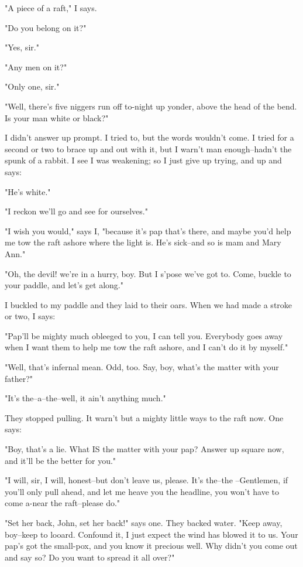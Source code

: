 "A piece of a raft," I says.

"Do you belong on it?"

"Yes, sir."

"Any men on it?"

"Only one, sir."

"Well, there's five niggers run off to-night up yonder, above the head of
the bend.  Is your man white or black?"

I didn't answer up prompt.  I tried to, but the words wouldn't come. I
tried for a second or two to brace up and out with it, but I warn't man
enough--hadn't the spunk of a rabbit.  I see I was weakening; so I just
give up trying, and up and says:

"He's white."

"I reckon we'll go and see for ourselves."

"I wish you would," says I, "because it's pap that's there, and maybe
you'd help me tow the raft ashore where the light is.  He's sick--and so
is mam and Mary Ann."

"Oh, the devil! we're in a hurry, boy.  But I s'pose we've got to.  Come,
buckle to your paddle, and let's get along."

I buckled to my paddle and they laid to their oars.  When we had made a
stroke or two, I says:

"Pap'll be mighty much obleeged to you, I can tell you.  Everybody goes
away when I want them to help me tow the raft ashore, and I can't do it
by myself."

"Well, that's infernal mean.  Odd, too.  Say, boy, what's the matter with
your father?"

"It's the--a--the--well, it ain't anything much."

They stopped pulling.  It warn't but a mighty little ways to the raft
now. One says:

"Boy, that's a lie.  What IS the matter with your pap?  Answer up square
now, and it'll be the better for you."

"I will, sir, I will, honest--but don't leave us, please.  It's the--the
--Gentlemen, if you'll only pull ahead, and let me heave you the
headline, you won't have to come a-near the raft--please do."

"Set her back, John, set her back!" says one.  They backed water.  "Keep
away, boy--keep to looard.  Confound it, I just expect the wind has
blowed it to us.  Your pap's got the small-pox, and you know it precious
well.  Why didn't you come out and say so?  Do you want to spread it all
over?"

